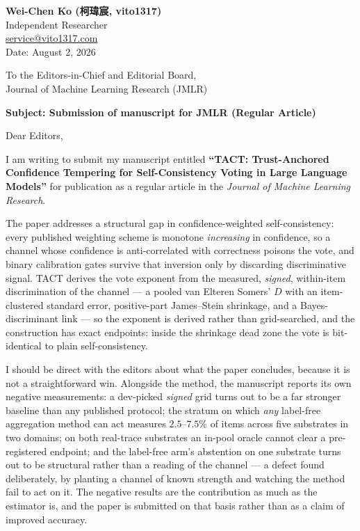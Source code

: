\documentclass[11pt]{article}
\begin{document}
\noindent
\textbf{Wei-Chen Ko ({\zhfont 柯瑋宸}, vito1317)} \\
Independent Researcher \\
\href{mailto:service@vito1317.com}{service@vito1317.com} \\
Date: August 2, 2026

\vspace{1.5em}

\noindent
To the Editors-in-Chief and Editorial Board, \\
Journal of Machine Learning Research (JMLR)

\vspace{1em}

\noindent
\textbf{Subject: Submission of manuscript for JMLR (Regular Article)}

\vspace{1em}

\noindent
Dear Editors,

\vspace{1em}

I am writing to submit my manuscript entitled \textbf{``TACT: Trust-Anchored
Confidence Tempering for Self-Consistency Voting in Large Language Models''}
for publication as a regular article in the \textit{Journal of Machine Learning
Research}.

The paper addresses a structural gap in confidence-weighted self-consistency:
every published weighting scheme is monotone \emph{increasing} in confidence,
so a channel whose confidence is anti-correlated with correctness poisons the
vote, and binary calibration gates survive that inversion only by discarding
discriminative signal. TACT derives the vote exponent from the measured,
\emph{signed}, within-item discrimination of the channel --- a pooled van
Elteren Somers' $D$ with an item-clustered standard error, positive-part
James--Stein shrinkage, and a Bayes-discriminant link --- so the exponent is
derived rather than grid-searched, and the construction has exact endpoints:
inside the shrinkage dead zone the vote is bit-identical to plain
self-consistency.

I should be direct with the editors about what the paper concludes, because it
is not a straightforward win. Alongside the method, the manuscript reports its
own negative measurements: a dev-picked \emph{signed} grid turns out to be a
far stronger baseline than any published protocol; the stratum on which
\emph{any} label-free aggregation method can act measures $2.5$--$7.5\%$ of
items across five substrates in two domains; on both real-trace substrates an
in-pool oracle cannot clear a pre-registered endpoint; and the label-free
arm's abstention on one substrate turns out to be structural rather than a
reading of the channel --- a defect found deliberately, by planting a channel
of known strength and watching the method fail to act on it. The negative
results are the contribution as much as the estimator is, and the paper is
submitted on that basis rather than as a claim of improved accuracy.
\end{document}
